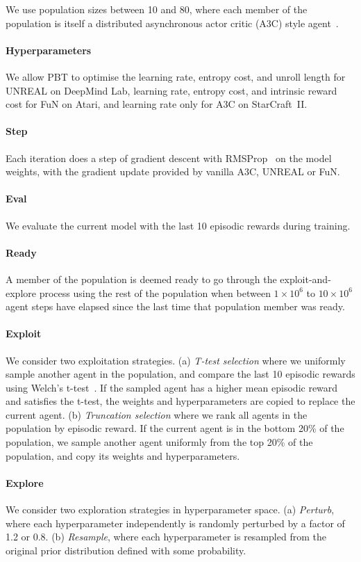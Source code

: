 We use population sizes between 10 and 80, where each member of the population is itself a distributed asynchronous actor critic (A3C) style agent~\citep{mnih2016asynchronous}. 
\vspace{-0.5em}\paragraph{Hyperparameters}We allow PBT to optimise the learning rate, entropy cost, and unroll length for UNREAL on DeepMind Lab, learning rate, entropy cost, and intrinsic reward cost for FuN on Atari, and learning rate only for A3C on StarCraft~II. 
\vspace{-0.5em}\paragraph{Step}Each iteration does a step of gradient descent with RMSProp~\citep{tieleman2012lecture} on the model weights, with the gradient update provided by vanilla A3C, UNREAL or FuN.
\vspace{-0.5em}\paragraph{Eval}We evaluate the current model with the last 10 episodic rewards during training.
\vspace{-0.5em}\paragraph{Ready} A member of the population is deemed ready to go through the exploit-and-explore process using the rest of the population when between $1\times10^6$ to $10\times10^6$ agent steps have elapsed since the last time that population member was ready.
\vspace{-0.5em}\paragraph{Exploit}We consider two exploitation strategies. (a) \emph{T-test selection} where we uniformly sample another agent in the population, and compare the last 10 episodic rewards using Welch's t-test~\citep{welch1947generalization}. If the sampled agent has a higher mean episodic reward and satisfies the t-test, the weights and hyperparameters are copied to replace the current agent. (b) \emph{Truncation selection} where we rank all agents in the population by episodic reward. If the current agent is in the bottom 20\% of the population, we sample another agent uniformly from the top 20\% of the population, and copy its weights and hyperparameters. 
\vspace{-0.5em}\paragraph{Explore}We consider two exploration strategies in hyperparameter space. (a) \emph{Perturb}, where each hyperparameter independently is randomly perturbed by a factor of 1.2 or 0.8. (b) \emph{Resample}, where each hyperparameter is resampled from the original prior distribution defined with some probability.

